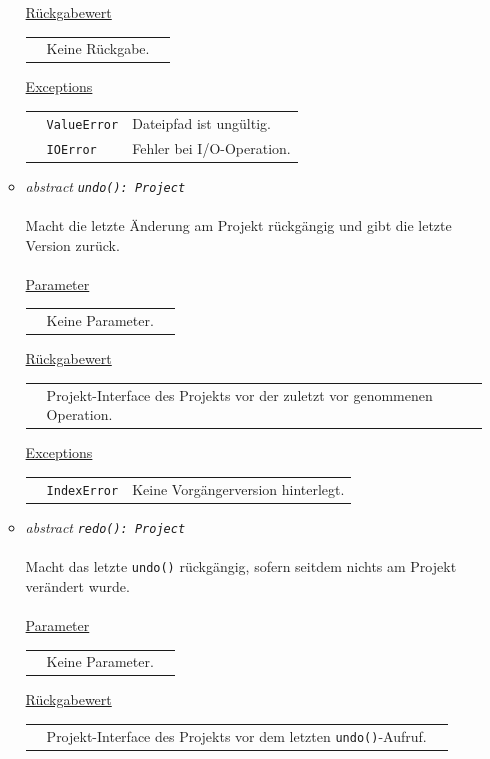 \documentclass{article}
\begin{document}
\begin{itemize}
\begin{itemize}
\underline{Rückgabewert}\\
\begin{tabular}{lll}
 & Keine Rückgabe.\\
\end{tabular}

\underline{Exceptions}\\
\begin{tabular}{lll}
 & \texttt{ValueError} & Dateipfad ist ungültig.\\
 & \texttt{IOError} & Fehler bei I/O-Operation.\\
\end{tabular}


\item \textit{\flqq{}abstract\frqq} \texttt{\textit{undo(): Project}}\\\\
Macht die letzte Änderung am Projekt rückgängig und gibt die letzte Version zurück.
\\\\
\underline{Parameter}\\
\begin{tabular}{lll}
 & Keine Parameter.
\end{tabular}

\underline{Rückgabewert}\\
\begin{tabular}{lll}
 & Projekt-Interface des Projekts vor der zuletzt vor genommenen Operation.\\
\end{tabular}

\underline{Exceptions}\\
\begin{tabular}{lll}
 & \texttt{IndexError} & Keine Vorgängerversion hinterlegt.\\
\end{tabular}


\item \textit{\flqq{}abstract\frqq} \texttt{\textit{redo(): Project}}\\\\
Macht das letzte \texttt{undo()} rückgängig, sofern seitdem nichts am Projekt verändert wurde.
\\\\
\underline{Parameter}\\
\begin{tabular}{lll}
 & Keine Parameter.
\end{tabular}

\underline{Rückgabewert}\\
\begin{tabular}{lll}
 & Projekt-Interface des Projekts vor dem letzten \texttt{undo()}-Aufruf.\\
\end{tabular}


\end{itemize}
\end{itemize}
\end{document}
